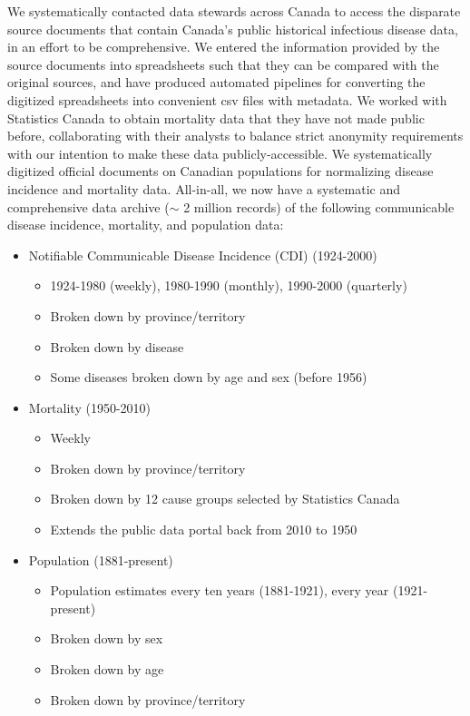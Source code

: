 We systematically contacted data stewards across Canada to access the disparate source documents that contain Canada's public historical infectious disease data, in an effort to be comprehensive. We entered the information provided by the source documents into spreadsheets such that they can be compared with the original sources, and have produced automated pipelines for converting the digitized spreadsheets into convenient csv files with metadata. We worked with Statistics Canada to obtain mortality data that they have not made public before, collaborating with their analysts to balance strict anonymity requirements with our intention to make these data publicly-accessible. We systematically digitized official documents on Canadian populations for normalizing disease incidence and mortality data. All-in-all, we now have a systematic and comprehensive data archive ($\sim$ 2 million records) of the following communicable disease incidence, mortality, and population data:
\begin{itemize}
  \item Notifiable Communicable Disease Incidence (CDI) (1924-2000)
    \begin{itemize}
      \item 1924-1980 (weekly), 1980-1990 (monthly), 1990-2000 (quarterly)
      \item Broken down by province/territory
      \item Broken down by disease
      \item Some diseases broken down by age and sex (before 1956)
    \end{itemize}
  \item Mortality (1950-2010)
    \begin{itemize}
      \item Weekly
      \item Broken down by province/territory
      \item Broken down by 12 cause groups selected by Statistics Canada
      \item Extends the public data portal back from 2010 to 1950
    \end{itemize}
  \item Population (1881-present)
    \begin{itemize}
      \item Population estimates every ten years (1881-1921), every year (1921-present)
      \item Broken down by sex
      \item Broken down by age
      \item Broken down by province/territory
    \end{itemize}
\end{itemize}

